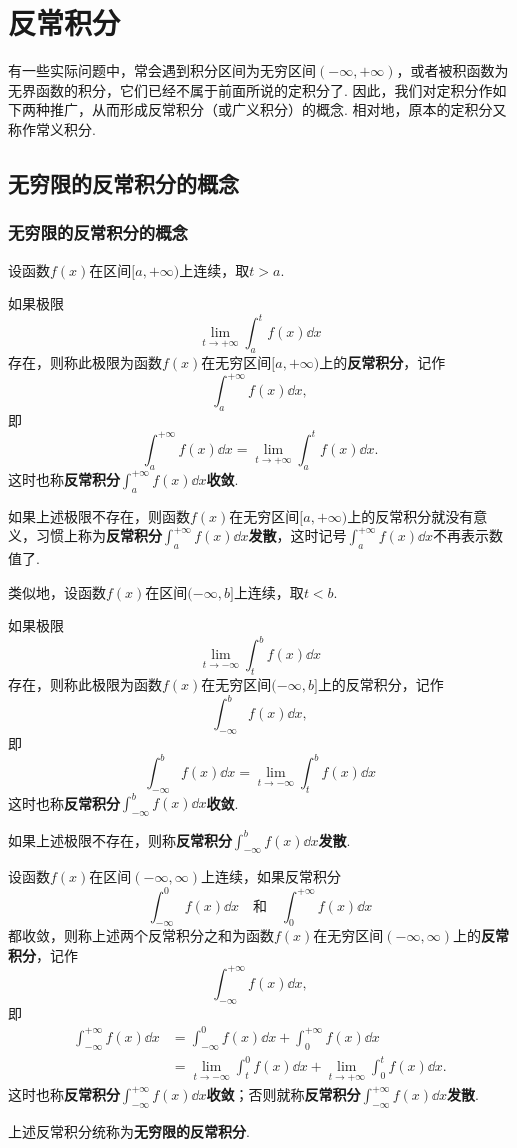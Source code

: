 \chapter{反常积分}
有一些实际问题中，常会遇到积分区间为无穷区间\((-\infty,+\infty)\)，或者被积函数为无界函数的积分，它们已经不属于前面所说的定积分了.
因此，我们对定积分作如下两种推广，从而形成反常积分（或广义积分）的概念.
相对地，原本的定积分又称作常义积分.

\section{无穷限的反常积分的概念}
\subsection{无穷限的反常积分的概念}
\begin{definition}\label{definition:定积分.无穷限的反常积分的定义}
设函数\(f(x)\)在区间\([a,+\infty)\)上连续，取\(t > a\).

如果极限\[
\lim\limits_{t \to +\infty} \int_a^t f(x) \dd{x}
\]存在，则称此极限为函数\(f(x)\)在无穷区间\([a,+\infty)\)上的\textbf{反常积分}，记作\[
\int_a^{+\infty} f(x) \dd{x},
\]即\[
\int_a^{+\infty} f(x) \dd{x} = \lim\limits_{t \to +\infty} \int_a^t f(x) \dd{x}.
\]这时也称\textbf{反常积分}\(\int_a^{+\infty} f(x) \dd{x}\)\textbf{收敛}.

如果上述极限不存在，则函数\(f(x)\)在无穷区间\([a,+\infty)\)上的反常积分就没有意义，习惯上称为\textbf{反常积分}\(\int_a^{+\infty} f(x) \dd{x}\)\textbf{发散}，这时记号\(\int_a^{+\infty} f(x) \dd{x}\)不再表示数值了.

类似地，设函数\(f(x)\)在区间\((-\infty,b]\)上连续，取\(t < b\).

如果极限\[
\lim\limits_{t \to -\infty} \int_t^b f(x) \dd{x}
\]存在，则称此极限为函数\(f(x)\)在无穷区间\((-\infty,b]\)上的反常积分，记作\[
\int_{-\infty}^b f(x) \dd{x},
\]即\[
\int_{-\infty}^b f(x) \dd{x} = \lim\limits_{t \to -\infty} \int_t^b f(x) \dd{x}
\]这时也称\textbf{反常积分}\(\int_{-\infty}^b f(x) \dd{x}\)\textbf{收敛}.

如果上述极限不存在，则称\textbf{反常积分}\(\int_{-\infty}^b f(x) \dd{x}\)\textbf{发散}.

\vspace{.5cm}

设函数\(f(x)\)在区间\((-\infty,\infty)\)上连续，如果反常积分\[
\int_{-\infty}^0 f(x) \dd{x}
\quad\text{和}\quad
\int_0^{+\infty} f(x) \dd{x}
\]都收敛，则称上述两个反常积分之和为函数\(f(x)\)在无穷区间\((-\infty,\infty)\)上的\textbf{反常积分}，记作\[
\int_{-\infty}^{+\infty} f(x) \dd{x},
\]即\begin{align*}
\int_{-\infty}^{+\infty} f(x) \dd{x}
&= \int_{-\infty}^0 f(x) \dd{x} + \int_0^{+\infty} f(x) \dd{x} \\
&= \lim\limits_{t \to -\infty} \int_t^0 f(x) \dd{x}
	+ \lim\limits_{t \to +\infty} \int_0^t f(x) \dd{x}.
\end{align*}
这时也称\textbf{反常积分}\(\int_{-\infty}^{+\infty} f(x) \dd{x}\)\textbf{收敛}；否则就称\textbf{反常积分}\(\int_{-\infty}^{+\infty} f(x) \dd{x}\)\textbf{发散}.

上述反常积分统称为\textbf{无穷限的反常积分}.
\end{definition}

